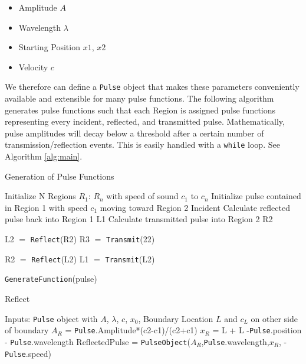 \documentclass[twocolumn, letterpaper]{article}
\begin{document}
\begin{itemize}
\item Amplitude $A$
\item Wavelength $\lambda$
\item Starting Position $x1$, $x2$
\item Velocity $c$
\end{itemize}

We therefore can define a \texttt{Pulse} object that makes these parameters conveniently available and extensible for many pulse functions. The following algorithm generates pulse functions such that each Region is assigned pulse functions representing every incident, reflected, and transmitted pulse. Mathematically, pulse amplitudes will decay below a threshold after a certain number of transmission/reflection events. This is easily handled with a  \texttt{while} loop. See Algorithm \ref{alg:main}.

\begin{algorithm}
\caption{Generation of Pulse Functions}
\label{alg:main}
\begin{algorithmic}[1]
\State Initialize N Regions $R_1$: $R_n$ with speed of sound $c_1$ to $c_n$
\State Initialize pulse contained in Region 1 with speed $c_1$ moving toward Region 2 \rightarrow Incident
\State Calculate reflected pulse back into Region 1 \rightarrow L1
\State Calculate transmitted pulse into Region 2 \rightarrow  R2

    \State L2 $=$ \texttt{Reflect}(R2)
    \State  R3 $=$ \texttt{Transmit}(22)
    
    \State R2 $=$ \texttt{Reflect}(L2)
    \State  L1 $=$ \texttt{Transmit}(L2)

\EndWhile
{}
	\texttt{GenerateFunction}(pulse)
\EndFor



\end{algorithmic}
\end{algorithm}

\begin{algorithm}
\caption{Reflect}
\label{alg:reflect}
\begin{algorithmic}[1]
\State Inputs: \texttt{Pulse} object with $A$, $\lambda$, $c$, $x_0$, 
\State Boundary Location $L$ and $c_L$ on other side of boundary
\State $A_R$ = \texttt{Pulse}.Amplitude*(c2-c1)/(c2+c1)
\State $x_R$ = L + L -\texttt{Pulse}.position - \texttt{Pulse}.wavelength
\State ReflectedPulse = \texttt{PulseObject}($A_R$,\texttt{Pulse}.wavelength,$x_R$, -\texttt{Pulse}.speed)


\end{algorithmic}
\end{algorithm}
\end{document}
